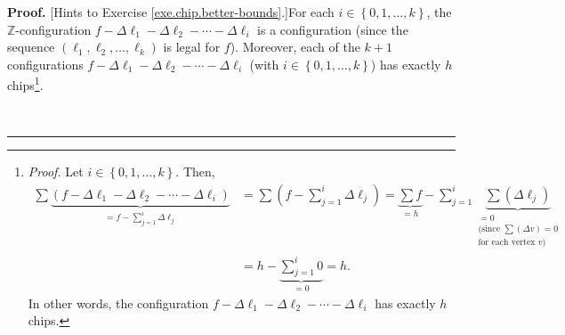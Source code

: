 \documentclass[numbers=enddot,12pt,final,onecolumn,notitlepage]{scrartcl}%
\theoremstyle{definition}
\newenvironment{proof}[1][Proof]{\noindent\textbf{#1.} }{\ \rule{0.5em}{0.5em}}
\let\sumnonlimits\sum
\renewcommand{\sum}{\sumnonlimits\limits}
\newcommand{\ZZ}{\mathbb{Z}}
\begin{document}
\begin{proof}
[Hints to Exercise \ref{exe.chip.better-bounds}.]For each $i\in\left\{
0,1,\ldots,k\right\}  $, the $\ZZ$-configuration $f-\Delta\ell
_{1}-\Delta\ell_{2}-\cdots-\Delta\ell_{i}$ is a configuration (since the
sequence $\left(  \ell_{1},\ell_{2},\ldots,\ell_{k}\right)  $ is legal for
$f$). Moreover, each of the $k+1$ configurations $f-\Delta\ell_{1}-\Delta
\ell_{2}-\cdots-\Delta\ell_{i}$ (with $i\in\left\{  0,1,\ldots,k\right\}  $)
has exactly $h$ chips\footnote{\textit{Proof.} Let $i\in\left\{
0,1,\ldots,k\right\}  $. Then,%
\begin{align*}
\sum\underbrace{\left(  f-\Delta\ell_{1}-\Delta\ell_{2}-\cdots-\Delta\ell
_{i}\right)  }_{=f-\sum_{j=1}^{i}\Delta\ell_{j}}  &  =\sum\left(  f-\sum
_{j=1}^{i}\Delta\ell_{j}\right)  =\underbrace{\sum f}_{=h}-\sum_{j=1}%
^{i}\underbrace{\sum\left(  \Delta\ell_{j}\right)  }%
_{\substack{=0\\\text{(since }\sum\left(  \Delta v\right)  =0\\\text{for each
vertex }v\text{)}}}\\
&  =h-\underbrace{\sum_{j=1}^{i}0}_{=0}=h.
\end{align*}
In other words, the configuration $f-\Delta\ell_{1}-\Delta\ell_{2}%
-\cdots-\Delta\ell_{i}$ has exactly $h$ chips.}.


\end{proof}
\end{document}
